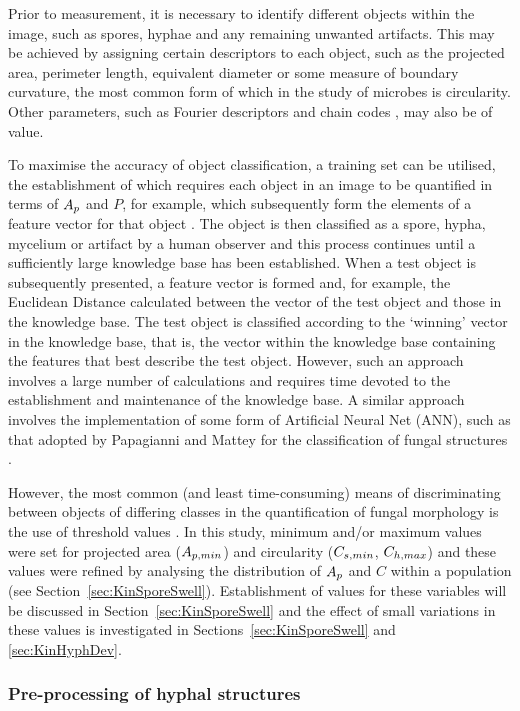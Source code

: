 Prior to measurement, it is necessary to identify different objects within the image, such as spores, hyphae and any remaining unwanted artifacts. This may be achieved by assigning certain descriptors to each object, such as the projected area, perimeter length, equivalent diameter or some measure of boundary curvature, the most common form of which in the study of microbes is circularity. Other parameters, such as Fourier descriptors \cite{pazoti2005} and chain codes \cite{wilson2002}, may also be of value.

To maximise the accuracy of object classification, a training set can be utilised, the establishment of which requires each object in an image to be quantified in terms of $A_p$ and $P$, for example, which subsequently form the elements of a feature vector for that object \cite{mangasarian1995}. The object is then classified as a spore, hypha, mycelium or artifact by a human observer and this process continues until a sufficiently large knowledge base has been established. When a test object is subsequently presented, a feature vector is formed and, for example, the Euclidean Distance calculated between the vector of the test object and those in the knowledge base. The test object is classified according to the \lq winning' vector in the knowledge base, that is, the vector within the knowledge base containing the features that best describe the test object. However, such an approach involves a large number of calculations and requires time devoted to the establishment and maintenance of the knowledge base. A similar approach involves the implementation of some form of Artificial Neural Net (ANN), such as that adopted by Papagianni and Mattey for the classification of fungal structures \cite{papagianni2006a}.

However, the most common (and least time-consuming) means of discriminating between objects of differing classes in the quantification of fungal morphology is the use of threshold values \cite{pinto2004,anikster2005}. In this study, minimum and/or maximum values were set for projected area ($A_{p,min}$) and circularity ($C_{s,min}$, $C_{h,max}$) and these values were refined by analysing the distribution of $A_p$ and $C$ within a population (see Section~\ref{sec:KinSporeSwell}). Establishment of values for these variables will be discussed in Section~\ref{sec:KinSporeSwell} and the effect of small variations in these values is investigated in Sections~\ref{sec:KinSporeSwell} and \ref{sec:KinHyphDev}.

\subsubsection{Pre-processing of hyphal structures}

